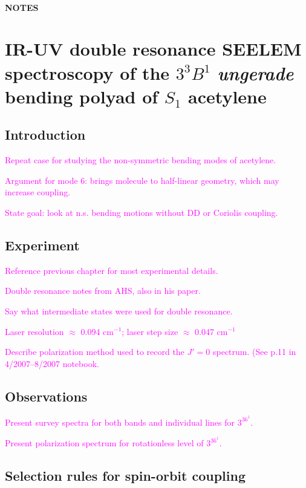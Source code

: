 \documentclass[12pt]{mitthesis}
\newcommand{\POINT}[1]{\textcolor{magenta}{#1}}
\newcommand{\rcm}{cm$^{-1}$}
\begin{document}
\tableofcontents
\clearpage

\subsubsection*{NOTES}
\clearpage

\chapter{IR-UV double resonance SEELEM spectroscopy of the $3^3B^1$
  \emph{ungerade} bending polyad of $S_1$ acetylene}

\section{Introduction}

\POINT{Repeat case for studying the non-symmetric bending modes of
  acetylene.}

\POINT{Argument for mode 6: brings molecule to half-linear geometry,
  which may increase coupling.}

\POINT{State goal: look at n.s. bending motions without DD or Coriolis
  coupling.}


\section{Experiment}

\POINT{Reference previous chapter for most experimental details.}

\POINT{Double resonance notes from AHS, also in his paper.}

\POINT{Say what intermediate states were used for double resonance.}

\POINT{Laser resolution $\approx$ 0.094 \rcm; laser step size
  $\approx$ 0.047 \rcm }

\POINT{Describe polarization method used to record the $J'=0$
  spectrum.  (See p.11 in 4/2007--8/2007 notebook.}

\section{Observations}

\POINT{Present survey spectra for both bands and individual lines for
  $3^36^1$.}

\POINT{Present polarization spectrum for rotationless level of
  $3^36^1$.}

\section{Selection rules for spin-orbit coupling}
\end{document}

